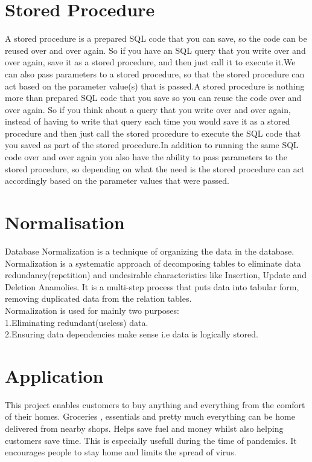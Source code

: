 \documentclass[12pt,a4paper]{report}
\begin{document}
\section{Stored Procedure}
A stored procedure is a prepared SQL code that you can save, so the code can be reused over and over again.
So if you have an SQL query that you write over and over again, save it as a stored procedure, and then just call it to execute it.We can also pass parameters to a stored procedure, so that the stored procedure can act based on the parameter value(s) that is passed.A stored procedure is nothing more than prepared SQL code that you save so you can reuse the code over and over again.  So if you think about a query that you write over and over again, instead of having to write that query each time you would save it as a stored procedure and then just call the stored procedure to execute the SQL code that you saved as part of the stored procedure.In addition to running the same SQL code over and over again you also have the ability to pass parameters to the stored procedure, so depending on what the need is the stored procedure can act accordingly based on the parameter values that were passed.

\section{Normalisation}
Database Normalization is a technique of organizing the data in the database. Normalization is a systematic approach of decomposing tables to eliminate data redundancy(repetition) and undesirable characteristics like Insertion, Update and Deletion Anamolies. It is a multi-step process that puts data into tabular form, removing duplicated data from the relation tables.\\
Normalization is used for mainly two purposes:\\
1.Eliminating redundant(useless) data.\\
2.Ensuring data dependencies make sense i.e data is logically stored.

\section{Application}
This project enables customers to buy anything and everything from the comfort of their homes. Groceries , essentials and pretty much everything can be home delivered from nearby shops. Helps save fuel and money whilst also helping customers save time. This is especially usefull during the time of pandemics. It encourages people to stay home and limits the spread of virus.
\end{document}
